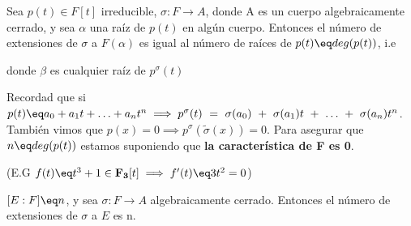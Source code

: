 \documentclass{apuntes}
\begin{document}
\begin{corol}
Sea $p(t) \in F[t]$ irreducible, $\sigma: F \rightarrow A$, donde A es un cuerpo algebraicamente cerrado, y sea $\alpha$ una raíz de $p(t)$ en algún cuerpo. Entonces el número de extensiones de $\sigma$ a $F(\alpha)$ es igual al número de raíces de $p(t) \eq deg(p(t))$, i.e


donde $\beta$ es cualquier raíz de $p^{\sigma}(t)$

Recordad que si $p(t) \eq a_0 + a_1t + \ldots + a_n t^n \implies p^{\sigma}(t)~=~\sigma(a_0)~+~\sigma(a_1)t~+~\ldots~+~\sigma(a_n)t^n$.
También vimos que $p(x) = 0 \implies p^{\sigma}(\tilde{\sigma}(x)) = 0$.
Para asegurar que $n \eq deg(p(t))$ estamos suponiendo que \textbf{la característica de F es 0}.


(E.G $f(t) \eq t^3 + 1 \in \mathbf{F_3}[t] \implies f'(t) \eq 3t^2 = 0$)

\end{corol}



\begin{corol}
$[E:F] \eq n$, y sea $\sigma: F \rightarrow A$ algebraicamente cerrado.
Entonces el número de extensiones de $\sigma$ a $E$ es n.
\end{corol}
\end{document}
